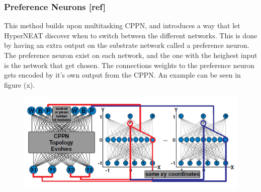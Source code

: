 \documentclass[11pt, a4paper]{article}
\begin{document}
\subsubsection{Preference Neurons [ref]}
This method builds upon multitasking CPPN, and introduces a way that let HyperNEAT discover when to switch between the different networks. This is done by having an extra output on the substrate network called a preference neuron. The preference neuron exist on each network, and the one with the heighest input is the network that get chosen. The connections weights to the preference neuron gets encoded by it's own output from the CPPN. An example can be seen in figure (x).
\begin{figure}[!ht]
\centering
\includegraphics[scale=0.6]{PreferenceNeurons}
\caption{}
\end{figure}
\end{document}
